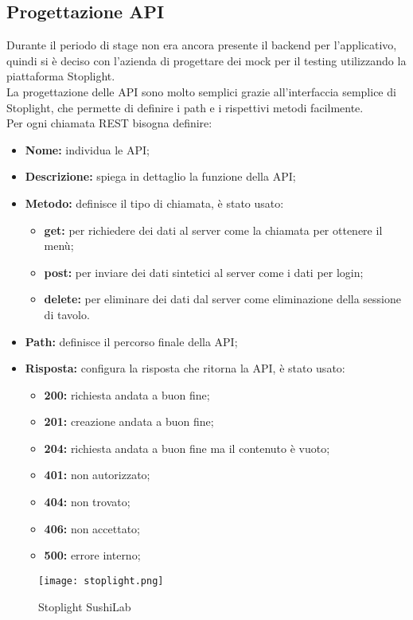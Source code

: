 \subsection{Progettazione API}
Durante il periodo di stage non era ancora presente il backend per l'applicativo, quindi si è deciso con l'azienda di progettare dei mock per il testing utilizzando la piattaforma Stoplight.\\
La progettazione delle API sono molto semplici grazie all'interfaccia semplice di Stoplight, che permette di definire i path e i rispettivi metodi facilmente.\\
Per ogni chiamata REST bisogna definire:
\begin{itemize}
    \item \textbf{Nome:} individua le API;
    \item \textbf{Descrizione:} spiega in dettaglio la funzione della API;
    \item \textbf{Metodo:} definisce il tipo di chiamata, è stato usato:
    \begin{itemize}
        \item  \textbf{get:} per richiedere dei dati al server come la chiamata per ottenere il menù;
        \item  \textbf{post:} per inviare dei dati sintetici al server come i dati per login;
        \item  \textbf{delete:} per eliminare dei dati dal server come eliminazione della sessione di tavolo.       
    \end{itemize}
    \item \textbf{Path:} definisce il percorso finale della API;
    \item \textbf{Risposta:} configura la risposta che ritorna la API, è stato usato:
    \begin{itemize}
        \item  \textbf{200:} richiesta andata a buon fine;
        \item  \textbf{201:} creazione andata a buon fine;
        \item  \textbf{204:} richiesta andata a buon fine ma il contenuto è vuoto;
        \item  \textbf{401:} non autorizzato;
        \item  \textbf{404:} non trovato;
        \item  \textbf{406:} non accettato;
        \item  \textbf{500:} errore interno;
    \end{itemize}
\end{itemize}
\begin{figure}[H]
    \centering
    \texttt{[image: stoplight.png]}
    \caption{Stoplight SushiLab}
\end{figure}
